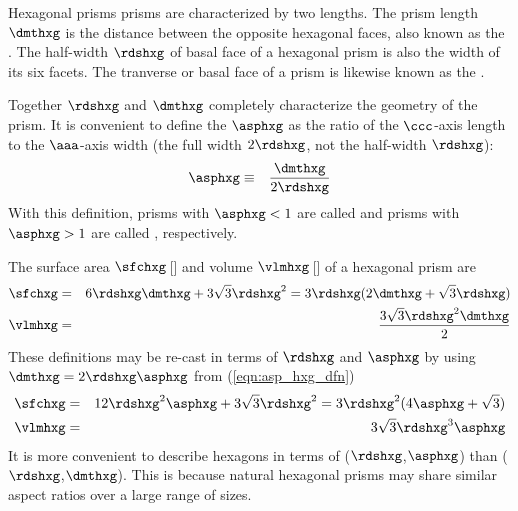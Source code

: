 \documentclass[12pt,twoside]{book}
\begin{document}
Hexagonal prisms prisms are characterized by two lengths.
The prism length $\dmthxg$ is the distance between the opposite
hexagonal faces, also known as the .
The half-width $\rdshxg$ of basal face of a hexagonal prism is also
the width of its six facets.
The tranverse or basal face of a prism is likewise known as the
. 

Together $\rdshxg$ and $\dmthxg$ completely characterize the geometry
of the prism.
It is convenient to define the  $\asphxg$ as the 
ratio of the $\ccc$-axis length to the $\aaa$-axis width (the full
width $2\rdshxg$, not the half-width $\rdshxg$):
\begin{eqnarray}
\asphxg & \equiv & \frac{\dmthxg}{2\rdshxg}
\label{eqn:asp_hxg_dfn}
\end{eqnarray}
With this definition, prisms with $\asphxg < 1$ are called 
 and prisms with $\asphxg > 1$ are called  
, respectively.

The surface area $\sfchxg$\,[\mS] and volume $\vlmhxg$\,[\mC] of a 
hexagonal prism are
\begin{eqnarray}
\sfchxg & = & 6\rdshxg\dmthxg+3\sqrt{3}\rdshxg^{2} = 
              3\rdshxg(2\dmthxg+\sqrt{3}\rdshxg) \\
\label{eqn:sfc_hxg_dfn}
\vlmhxg & = & \frac{3\sqrt{3}\rdshxg^{2}\dmthxg}{2}
\label{eqn:vlm_hxg_dfn}
\end{eqnarray}
These definitions may be re-cast in terms of $\rdshxg$ and $\asphxg$
by using $\dmthxg = 2\rdshxg\asphxg$ from (\ref{eqn:asp_hxg_dfn})  
\begin{eqnarray}
\sfchxg & = & 12\rdshxg^{2}\asphxg+3\sqrt{3}\rdshxg^{2} = 
              3\rdshxg^{2}(4\asphxg+\sqrt{3}) \\
\label{eqn:sfc_hxg_asp_dfn}
\vlmhxg & = & 3\sqrt{3}\rdshxg^{3}\asphxg
\label{eqn:vlm_hxg_asp_dfn}
\end{eqnarray}
It is more convenient to describe hexagons in terms
of ($\rdshxg$,$\asphxg$) than ($\rdshxg$,$\dmthxg$).
This is because natural hexagonal prisms may share similar aspect
ratios over a large range of sizes.
\end{document}
